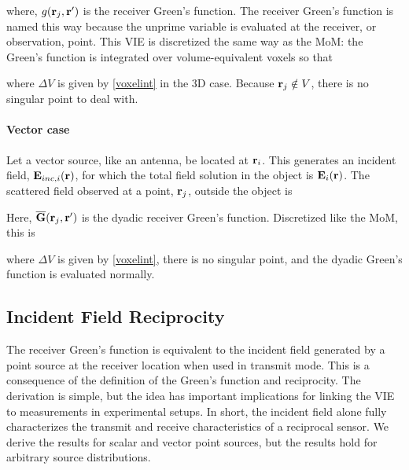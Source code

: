 \noindent where, $g(\mathbf{r}_j,\mathbf{r}')$ is the receiver Green's function. The receiver Green's function is named this way because the unprime variable is evaluated at the receiver, or observation, point. This VIE is discretized the same way as the MoM: the Green's function is integrated over volume-equivalent voxels so that
 
\noindent where $\Delta V$ is given by \eqref{voxelint} in the 3D case. Because $\mathbf{r}_{j} \notin V$, there is no singular point to deal with.

\paragraph{Vector case}

Let a vector source, like an antenna, be located at $\mathbf{r}_i$. This generates an incident field, $\mathbf{E}_{inc,i}(\mathbf{r})$, for which the total field solution in the object is $\mathbf{E}_{i}(\mathbf{r})$. The scattered field observed at a point, $\mathbf{r}_j$, outside the object is

Here, $\overline{\mathbf{G}}(\mathbf{r}_j,\mathbf{r}')$ is the dyadic receiver Green's function. Discretized like the MoM, this is 

\noindent where $\Delta V$ is given by \eqref{voxelint}, there is no singular point, and the dyadic Green's function is evaluated normally. 

\subsection{Incident Field Reciprocity}

The receiver Green's function is equivalent to the incident field generated by a point source at the receiver location when used in transmit mode. This is a consequence of the definition of the Green's function and reciprocity. The derivation is simple, but the idea has important implications for linking the VIE to measurements in experimental setups. In short, the incident field alone fully characterizes the transmit and receive characteristics of a reciprocal sensor. We derive the results for scalar and vector point sources, but the results hold for arbitrary source distributions. 

